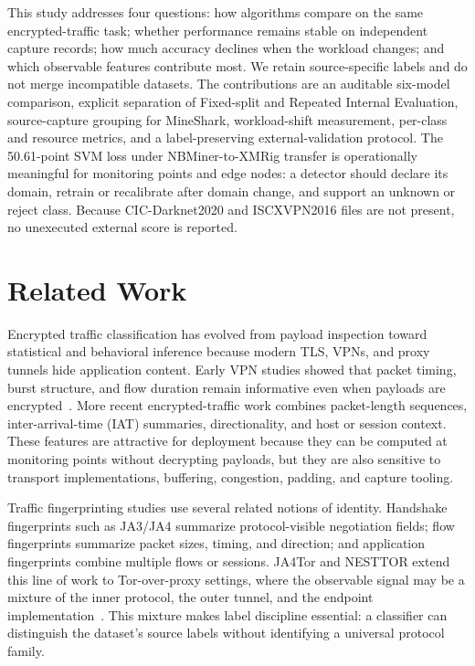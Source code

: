 \documentclass[conference]{IEEEtran}
\begin{document}
This study addresses four questions: how algorithms compare on the same encrypted-traffic task; whether performance remains stable on independent capture records; how much accuracy declines when the workload changes; and which observable features contribute most. We retain source-specific labels and do not merge incompatible datasets. The contributions are an auditable six-model comparison, explicit separation of Fixed-split and Repeated Internal Evaluation, source-capture grouping for MineShark, workload-shift measurement, per-class and resource metrics, and a label-preserving external-validation protocol. The 50.61-point SVM loss under NBMiner-to-XMRig transfer is operationally meaningful for monitoring points and edge nodes: a detector should declare its domain, retrain or recalibrate after domain change, and support an unknown or reject class. Because CIC-Darknet2020 and ISCXVPN2016 files are not present, no unexecuted external score is reported.

\section{Related Work}
Encrypted traffic classification has evolved from payload inspection toward statistical and behavioral inference because modern TLS, VPNs, and proxy tunnels hide application content. Early VPN studies showed that packet timing, burst structure, and flow duration remain informative even when payloads are encrypted~\cite{gil}. More recent encrypted-traffic work combines packet-length sequences, inter-arrival-time (IAT) summaries, directionality, and host or session context. These features are attractive for deployment because they can be computed at monitoring points without decrypting payloads, but they are also sensitive to transport implementations, buffering, congestion, padding, and capture tooling.

Traffic fingerprinting studies use several related notions of identity. Handshake fingerprints such as JA3/JA4 summarize protocol-visible negotiation fields; flow fingerprints summarize packet sizes, timing, and direction; and application fingerprints combine multiple flows or sessions. JA4Tor and NESTTOR extend this line of work to Tor-over-proxy settings, where the observable signal may be a mixture of the inner protocol, the outer tunnel, and the endpoint implementation~\cite{nesttor}. This mixture makes label discipline essential: a classifier can distinguish the dataset's source labels without identifying a universal protocol family.
\end{document}
